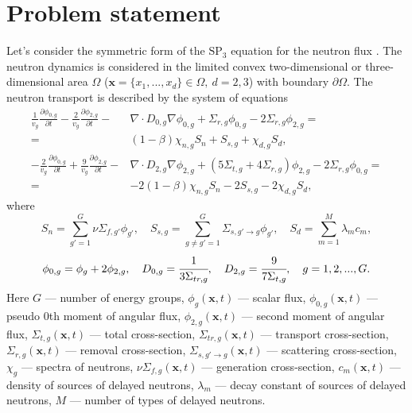 \documentclass[authoryear]{elsarticle}
\begin{document}
\section{Problem statement}
Let’s consider the symmetric form of the $\mathrm{SP_3}$ equation for the neutron flux \citep{ryu2013fem}.
The neutron dynamics is considered in the limited convex two-dimensional or three-dimensional area  $\Omega$ ($\bm x = \{x_1, ..., x_d\} \in \Omega, \ d = 2,3$) with boundary $\partial \Omega$. 
The neutron transport is described by the system of equations
\begin{equation}\label{1.1}
\begin{split}
 \frac{1}{v_g} \frac{\partial \phi_{0,g}}{\partial t} - \frac{2}{v_g} \frac{\partial \phi_{2,g}}{\partial t} - & \nabla \cdot D_{0,g} \nabla \phi_{0,g} + \Sigma_{r,g} \phi_{0,g} -  2\Sigma_{r,g} \phi_{2,g} = \\ 
 =  & (1-\beta)\chi_{n,g} S_{n} + S_{s,g} + \chi_{d,g} S_d, \\
 -\frac{2}{v_g} \frac{\partial \phi_{0,g}}{\partial t} + \frac{9}{v_g} \frac{\partial \phi_{2,g}}{\partial t} - & \nabla \cdot D_{2,g} \nabla \phi_{2,g} + (5\Sigma_{t,g} + 4\Sigma_{r,g}) \phi_{2,g} - 2\Sigma_{r,g} \phi_{0,g} = \\ 
 =  & -2(1-\beta)\chi_{n,g} S_{n} - 2S_{s,g} - 2\chi_{d,g} S_d,
\end{split}
\end{equation}
where
\[
S_{n} =  \sum_{g'=1}^{G} \nu \Sigma_{f,g'} \phi_{g'}, 
\quad
S_{s,g} = \sum_{g\neq g'=1}^{G} \Sigma_{s,g'\rightarrow g} \phi_{g'},
\quad
S_{d} = \sum_{m=1}^{M} \lambda_m c_m,
\]
\[
\phi_{0,g}=\phi_g + 2\phi_{2,g}, 
\quad
D_{0,g} = \cfrac{1}{3\Sigma_{tr,g}}, 
\quad
D_{2,g} = \cfrac{9}{7\Sigma_{t,g}}, 
\quad g=1,2,...,G.
\]
Here $G$ --- number of energy groups,
$\phi_g(\bm x, t)$ --- scalar flux,
$\phi_{0,g}(\bm x, t)$ --- pseudo 0th moment of angular flux,
$\phi_{2,g}(\bm x, t)$ --- second moment of angular flux,
$\Sigma_{t,g}(\bm x, t)$ --- total cross-section, 
$\Sigma_{tr,g}(\bm x, t)$ --- transport cross-section, 
$\Sigma_{r,g}(\bm x, t)$ --- removal cross-section,
$\Sigma_{s,g'\rightarrow g}(\bm x, t)$ --- scattering cross-section,
$\chi_g$  --- spectra of neutrons, 
$\nu\Sigma_{f,g}(\bm x, t)$ --- generation cross-section,
$c_m(\bm x, t)$ --- density of sources of delayed neutrons,
$\lambda_m$ --- decay constant of sources of delayed neutrons,
$M$ --- number of types of delayed neutrons.
\end{document}
